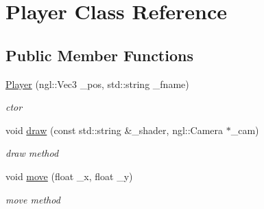 \hypertarget{class_player}{\section{Player Class Reference}
\label{class_player}
}
\subsection*{Public Member Functions}
\begin{DoxyCompactItemize}
\item 
\hyperlink{class_player_aefda42632e28f032d83750890da0fb26}{Player} (ngl\-::\-Vec3 \-\_\-pos, std\-::string \-\_\-fname)
\begin{DoxyCompactList}\small\item\em ctor \end{DoxyCompactList}\item 
void \hyperlink{class_player_afa7a7c657b9ab9f7bd342db96c1608af}{draw} (const std\-::string \&\-\_\-shader, ngl\-::\-Camera $\ast$\-\_\-cam)
\begin{DoxyCompactList}\small\item\em draw method \end{DoxyCompactList}\item 
void \hyperlink{class_player_a564e56488765c3fd7216698c415d9431}{move} (float \-\_\-x, float \-\_\-y)
\begin{DoxyCompactList}\small\item\em move method \end{DoxyCompactList}\end{DoxyCompactItemize}
